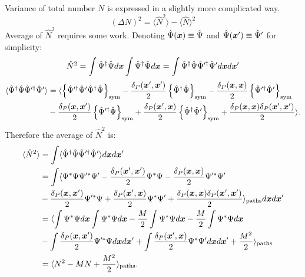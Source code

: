 Variance of total number $N$ is expressed in a slightly more complicated way.
\[
	(\Delta N)^2
		= \langle \hat{N}^2 \rangle - \langle \hat{N} \rangle^2
\]
Average of $\hat{N}^2$ requires some work.
Denoting $\hat{\Psi}(\boldsymbol{x}) \equiv \hat{\Psi}$ and $\hat{\Psi}(\boldsymbol{x}^\prime) \equiv \hat{\Psi}^\prime$ for simplicity:
\[
	\hat{N}^2
		= \int \hat{\Psi}^\dagger \hat{\Psi} d\boldsymbol{x}
			\int \hat{\Psi}^\dagger \hat{\Psi} d\boldsymbol{x}
		= \int
			\hat{\Psi}^\dagger \hat{\Psi}
			\hat{\Psi}^{\prime\dagger} \hat{\Psi}^\prime
			d\boldsymbol{x} d\boldsymbol{x}^\prime
\]
\begin{equation*}
\begin{split}
	\langle
		\hat{\Psi}^\dagger \hat{\Psi} \hat{\Psi}^{\prime\dagger} \hat{\Psi}^\prime
	\rangle
	& = \langle
		\left\{  \hat{\Psi}^{\prime\dagger} \hat{\Psi}^\prime \hat{\Psi}^\dagger \hat{\Psi} \right\}_{\mathrm{sym}}
		- \frac{\delta_P(\boldsymbol{x}^\prime,\boldsymbol{x}^\prime)}{2} \left\{ \hat{\Psi}^\dagger \hat{\Psi} \right\}_{\mathrm{sym}}
		- \frac{\delta_P(\boldsymbol{x},\boldsymbol{x})}{2} \left\{ \hat{\Psi}^{\prime\dagger} \hat{\Psi}^\prime \right\}_{\mathrm{sym}} \\
	& - \frac{\delta_P(\boldsymbol{x},\boldsymbol{x}^\prime)}{2} \left\{ \hat{\Psi}^{\prime\dagger} \hat{\Psi} \right\}_{\mathrm{sym}}
		+ \frac{\delta_P(\boldsymbol{x}^\prime,\boldsymbol{x})}{2} \left\{ \hat{\Psi}^\dagger \hat{\Psi}^\prime \right\}_{\mathrm{sym}}
		+ \frac{\delta_P(\boldsymbol{x},\boldsymbol{x}) \delta_P(\boldsymbol{x}^\prime,\boldsymbol{x}^\prime)}{2}
	\rangle.
\end{split}
\end{equation*}
Therefore the average of $\hat{N}^2$ is:
\begin{equation*}
\begin{split}
	\langle \hat{N}^2 \rangle & = \int
		\langle
			\hat{\Psi}^\dagger \hat{\Psi} \hat{\Psi}^{\prime\dagger} \hat{\Psi}^\prime
		\rangle
	d\boldsymbol{x} d\boldsymbol{x}^\prime \\
	& = \int \langle 
		\Psi^* \Psi \Psi^{\prime *} \Psi^\prime
		- \frac{\delta_P(\boldsymbol{x}^\prime,\boldsymbol{x}^\prime)}{2} \Psi^* \Psi
		- \frac{\delta_P(\boldsymbol{x},\boldsymbol{x}) }{2} \Psi^{\prime *} \Psi^\prime \\
	&	- \frac{\delta_P(\boldsymbol{x},\boldsymbol{x}^\prime)}{2} \Psi^{\prime *} \Psi
		+ \frac{\delta_P(\boldsymbol{x}^\prime,\boldsymbol{x})}{2} \Psi^* \Psi^\prime
		+ \frac{\delta_P(\boldsymbol{x},\boldsymbol{x}) \delta_P(\boldsymbol{x}^\prime,\boldsymbol{x}^\prime)}{2}
	 \rangle_{\mathrm{paths}} d\boldsymbol{x} d\boldsymbol{x}^\prime \\
	& = \langle 
		\int \Psi^* \Psi d\boldsymbol{x} \int \Psi^* \Psi d\boldsymbol{x}
		- \frac{M}{2} \int \Psi^* \Psi d\boldsymbol{x}
		- \frac{M}{2} \int \Psi^* \Psi d\boldsymbol{x} \\
	&	- \int \frac{\delta_P(\boldsymbol{x},\boldsymbol{x}^\prime)}{2} \Psi^{\prime *} \Psi d\boldsymbol{x} d\boldsymbol{x}^\prime
		+ \int \frac{\delta_P(\boldsymbol{x}^\prime,\boldsymbol{x})}{2} \Psi^* \Psi^\prime d\boldsymbol{x} d\boldsymbol{x}^\prime
		+ \frac{M^2}{2}
	 \rangle_{\mathrm{paths}} \\
	& = \langle N^2 - M N + \frac{M^2}{2} \rangle_{\mathrm{paths}}.
\end{split}
\end{equation*}
